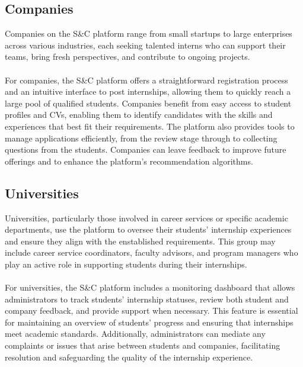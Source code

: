 \subsection{Companies}
Companies on the S\&C platform range from small startups to large enterprises across various industries, each seeking talented interns who can support their teams, bring fresh perspectives, and contribute to ongoing projects. \\ \\
For companies, the S\&C platform offers a straightforward registration process and an intuitive interface to post internships, allowing them to quickly reach a large pool of qualified students. Companies benefit from easy access to student profiles and CVs, enabling them to identify candidates with the skills and experiences that best fit their requirements. The platform also provides tools to manage applications efficiently, from the review stage through to collecting questions from the students. Companies can leave feedback to improve future offerings and to enhance the platform’s recommendation algorithms.

\subsection{Universities}
Universities, particularly those involved in career services or specific academic departments, use the platform to oversee their students’ internship experiences and ensure they align with the enstablished requirements. This group may include career service coordinators, faculty advisors, and program managers who play an active role in supporting students during their internships.\\ \\
For universities, the S\&C platform includes a monitoring dashboard that allows administrators to track students’ internship statuses, review both student and company feedback, and provide support when necessary. This feature is essential for maintaining an overview of students’ progress and ensuring that internships meet academic standards. Additionally, administrators can mediate any complaints or issues that arise between students and companies, facilitating resolution and safeguarding the quality of the internship experience.
\\ \\

